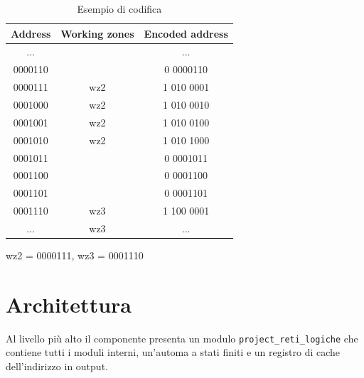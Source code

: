 \documentclass[a4paper]{article}
\begin{document}
\begin{table}[H]
  
  \ttfamily
  \begin{tabular} {|c|c|c|}
    \hline
    \bf{Address} & \bf{Working zones}          & \bf{Encoded address} \\
    \hline
    ...          &                             & ...                  \\
    \hline
    0000110      &                             & 0 0000110            \\
    \hline
    0000111      & \cellcolor[HTML]{E0E0E0}wz2 & 1 010 0001           \\
    \hline
    0001000      & \cellcolor[HTML]{E0E0E0}wz2 & 1 010 0010           \\
    \hline
    0001001      & \cellcolor[HTML]{E0E0E0}wz2 & 1 010 0100           \\
    \hline
    0001010      & \cellcolor[HTML]{E0E0E0}wz2 & 1 010 1000           \\
    \hline
    0001011      &                             & 0 0001011            \\
    \hline
    0001100      &                             & 0 0001100            \\
    \hline
    0001101      &                             & 0 0001101            \\
    \hline
    0001110      & \cellcolor[HTML]{E0E0E0}wz3 & 1 100 0001           \\
    \hline
    ...          & \cellcolor[HTML]{E0E0E0}wz3 & ...                  \\
    \hline
    
  \end{tabular}
  
  wz2 = 0000111, wz3 = 0001110
  \caption{Esempio di codifica}
\end{table}

\section{Architettura}
Al livello più alto il componente presenta un modulo \texttt{project\_reti\_logiche} che contiene tutti i moduli interni, un'automa a stati finiti e un registro di cache dell'indirizzo in output.
\end{document}
